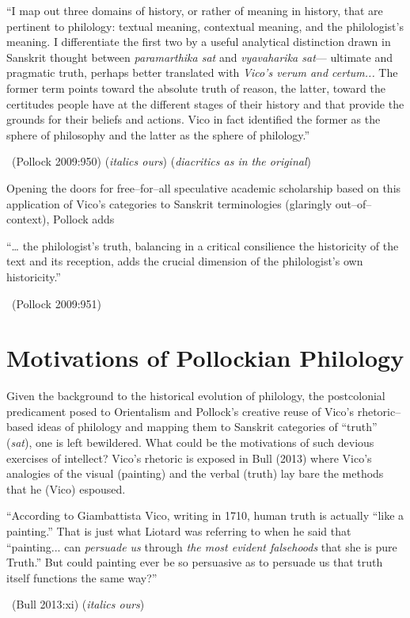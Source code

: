 \begin{myquote}
“I map out three domains of history, or rather of meaning in history, that are pertinent to philology: textual meaning, contextual meaning, and the philologist’s meaning. I differentiate the first two by a useful analytical distinction drawn in Sanskrit thought between \textit{paramarthika sat} and \textit{vyavaharika sat}— ultimate and pragmatic truth, perhaps better translated with \textit{Vico’s verum and certum...} The former term points toward the absolute truth of reason, the latter, toward the certitudes people have at the different stages of their history and that provide the grounds for their beliefs and actions. Vico in fact identified the former as the sphere of philosophy and the latter as the sphere of philology.” 

~\hfill (Pollock 2009:950) (\textit{italics ours}) (\textit{diacritics as in the original})
\end{myquote}

Opening the doors for free–for–all speculative academic scholarship based on this application of Vico’s categories to Sanskrit terminologies (glaringly out–of–context), Pollock adds

\begin{myquote}
“… the philologist’s truth, balancing in a critical consilience the historicity of the text and its reception, adds the crucial dimension of the philologist’s own historicity.” 

~\hfill (Pollock 2009:951)
\end{myquote}


\section*{Motivations of Pollockian Philology}

Given the background to the historical evolution of philology, the postcolonial predicament posed to Orientalism and Pollock’s creative reuse of Vico’s rhetoric–based ideas of philology and mapping them to Sanskrit categories of “truth” (\textit{sat}), one is left bewildered. What could be the motivations of such devious exercises of intellect? Vico’s rhetoric is exposed in Bull (2013) where Vico’s analogies of the visual (painting) and the verbal (truth) lay bare the methods that he (Vico) espoused.

\begin{myquote}
“According to Giambattista Vico, writing in 1710, human truth is actually “like a painting.” That is just what Liotard was referring to when he said that “painting... can \textit{persuade us} through \textit{the most evident falsehoods} that she is pure Truth.” But could painting ever be so persuasive as to persuade us that truth itself functions the same way?” 

~\hfill (Bull 2013:xi) (\textit{italics ours})
\end{myquote}

